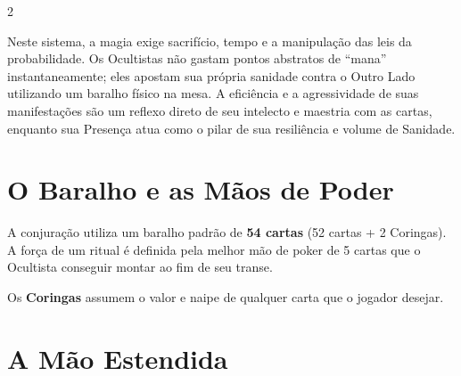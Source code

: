 \documentclass[a4paper,11pt,openany]{book}
\begin{document}
\begin{multicols}{2}

Neste sistema, a magia exige sacrifício, tempo e a manipulação das leis da probabilidade. Os Ocultistas não gastam pontos abstratos de ``mana'' instantaneamente; eles apostam sua própria sanidade contra o Outro Lado utilizando um baralho físico na mesa. A eficiência e a agressividade de suas manifestações são um reflexo direto de seu intelecto e maestria com as cartas, enquanto sua Presença atua como o pilar de sua resiliência e volume de Sanidade.

\section{O Baralho e as Mãos de Poder}

A conjuração utiliza um baralho padrão de \textbf{54 cartas} (52 cartas + 2 Coringas). A força de um ritual é definida pela melhor mão de poker de 5 cartas que o Ocultista conseguir montar ao fim de seu transe. 

Os \textbf{Coringas} assumem o valor e naipe de qualquer carta que o jogador desejar.

\begin{table}[H]
\centering
\sffamily
{}
\end{table}

\section{A Mão Estendida}


\end{multicols}
\end{document}
